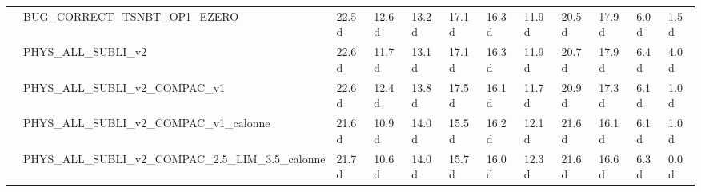 \begin{tabular}{llllllllllll}
 & BUG_CORRECT_TSNBT_OP1_EZERO & 22.5 d & 12.6 d & 13.2 d & 17.1 d & 16.3 d & 11.9 d & 20.5 d & 17.9 d & 6.0 d & 1.5 d \\
 & PHYS_ALL_SUBLI_v2 & 22.6 d & 11.7 d & 13.1 d & 17.1 d & 16.3 d & 11.9 d & 20.7 d & 17.9 d & 6.4 d & 4.0 d \\
 & PHYS_ALL_SUBLI_v2_COMPAC_v1 & 22.6 d & 12.4 d & 13.8 d & 17.5 d & 16.1 d & 11.7 d & 20.9 d & 17.3 d & 6.1 d & 1.0 d \\
 & PHYS_ALL_SUBLI_v2_COMPAC_v1_calonne & 21.6 d & 10.9 d & 14.0 d & 15.5 d & 16.2 d & 12.1 d & 21.6 d & 16.1 d & 6.1 d & 1.0 d \\
 & PHYS_ALL_SUBLI_v2_COMPAC_2.5_LIM_3.5_calonne & 21.7 d & 10.6 d & 14.0 d & 15.7 d & 16.0 d & 12.3 d & 21.6 d & 16.6 d & 6.3 d & 0.0 d \\
\cline{1-12}
\bottomrule
\end{tabular}
